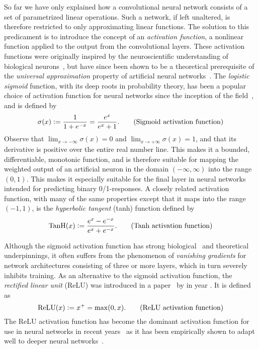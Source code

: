 So far we have only explained how a convolutional neural network consists of a set of parametrized linear operations.
Such a network, if left unaltered, is therefore restricted to only approximating linear functions.
The solution to this predicament is to introduce the concept of an \textit{activation function}, a nonlinear function applied to the output from the convolutional layers.
These activation functions were originally inspired by the neuroscientific understanding of biological neurons~\cite[p.~165]{goodfellow}, but have since been shown to be a theoretical prerequisite of the \textit{universal approximation} property of artificial neural networks~\cite{uat-sigmoid,uat-nonpolynomial}.
The \textit{logistic sigmoid} function, with its deep roots in probability theory, has been a popular choice of activation function for neural networks since the inception of the field~\cite{rosenblatt-perceptron-1958}, and is defined by
%
\begin{equation*}
  \sigma(x)
  \vcentcolon=
  \frac{1}{1 + e^{-x}} = \frac{e^x}{e^x + 1}.
  \tag{Sigmoid activation function}
\end{equation*}
%
Observe that $\lim_{x \to -\infty} \sigma(x) = 0$ and $\lim_{x \to +\infty} \sigma(x) = 1$, and that its derivative is positive over the entire real number line. This makes it a bounded, differentiable, monotonic function, and is therefore suitable for mapping the weighted output of an artificial neuron in the domain $(-\infty, \infty)$ into the range $(0, 1)$.
This makes it especially suitable for the final layer in neural networks intended for predicting binary 0/1-responses.
A closely related activation function, with many of the same properties except that it maps into the range $(-1, 1)$, is the \textit{hyperbolic tangent} (tanh) function defined by
%
\begin{equation*}
  \mathrm{TanH}(x)
  \vcentcolon=
  \frac{
    e^x - e^{-x}
  }{
    e^x + e^{-x}
  }.
  \tag{Tanh activation function}
\end{equation*}

Although the sigmoid activation function has strong biological~\cite{rosenblatt-perceptron-1958} and theoretical~\cite{uat-sigmoid} underpinnings, it often suffers from the phenomenon of \textit{vanishing gradients} for network architectures consisting of three or more layers, which in turn severely inhibits training.
As an alternative to the sigmoid activation function, the \textit{rectified linear unit} (ReLU) was introduced in a paper~\cite{relu-original-paper} by \citeauthor{relu-original-paper} in year \citeyear{relu-original-paper}.
It is defined as
%
\begin{equation*}
  \mathrm{ReLU}(x)
  \vcentcolon=
  x^+ = \max(0, x).
  \tag{ReLU activation function}
\end{equation*}
%
The ReLU activation function has become the dominant activation function for use in neural networks in recent years~\cite[p.~438]{relu-popularity} as it has been empirically shown to adapt well to deeper neural networks~\cite{relu-better-than-sigmoid}.
